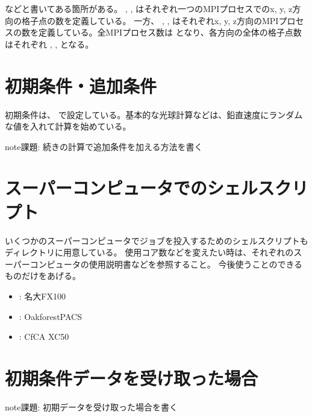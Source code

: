 \documentclass[letterpaper,10pt,dvipdfmx,report]{sphinxmanual}
\begin{document}
などと書いてある箇所がある。 ,  ,  はそれぞれ一つのMPIプロセスでのx, y, z方向の格子点の数を定義している。
一方、  ,  ,  はそれぞれx, y, z方向のMPIプロセスの数を定義している。全MPIプロセス数は  となり、各方向の全体の格子点数はそれぞれ  ,  ,  となる。


\section{初期条件・追加条件}
\label{\detokenize{start:id10}}
初期条件は、  で設定している。基本的な光球計算などは、鉛直速度にランダムな値を入れて計算を始めている。

\begin{sphinxadmonition}{note}{\label{\detokenize{start:id11}}課題:}
続きの計算で追加条件を加える方法を書く
\end{sphinxadmonition}


\section{スーパーコンピュータでのシェルスクリプト}
\label{\detokenize{start:id12}}
いくつかのスーパーコンピュータでジョブを投入するためのシェルスクリプトも  ディレクトリに用意している。
使用コア数などを変えたい時は、それぞれのスーパーコンピュータの使用説明書などを参照すること。
今後使うことのできるものだけをあげる。
\begin{itemize}
\item {} 
 : 名大FX100

\item {} 
 : Oakforest\sphinxhyphen{}PACS

\item {} 
 : CfCA XC50

\end{itemize}


\section{初期条件データを受け取った場合}
\label{\detokenize{start:id13}}
\begin{sphinxadmonition}{note}{\label{\detokenize{start:id14}}課題:}
初期データを受け取った場合を書く
\end{sphinxadmonition}
\end{document}
